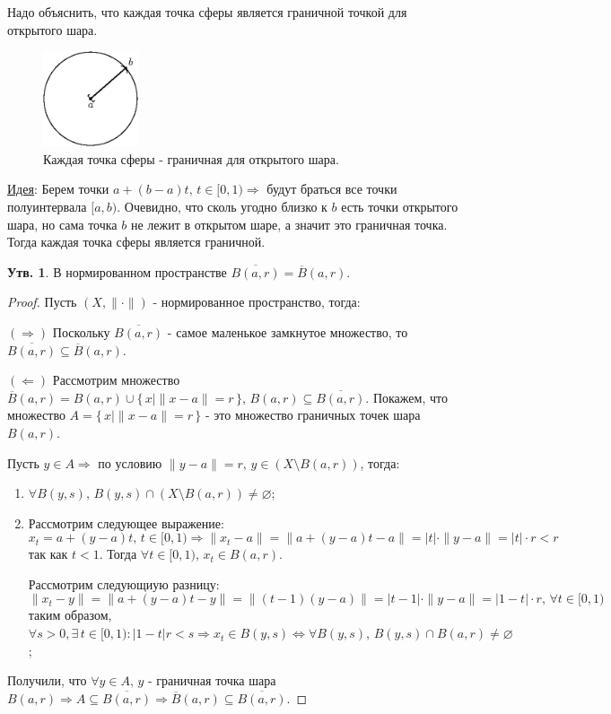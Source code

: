 \documentclass[12pt]{article}
\newcommand{\VN}{\varnothing}
\theoremstyle{definition}
\newtheorem{prop}{Утв.}
\begin{document}
Надо объяснить, что каждая точка сферы является граничной точкой для открытого шара.
\begin{figure}[H]
	\centering
	\includegraphics[width=0.25\textwidth]{8_1.eps}
	\caption{Каждая точка сферы - граничная для открытого шара.}
	\label{8_1}
\end{figure}
\uline{Идея}: Берем точки $a + (b-a)t, \, t \in [0,1) \Rightarrow$ будут браться все точки полуинтервала $[a,b)$. Очевидно, что сколь угодно близко к $b$ есть точки открытого шара, но сама точка $b$ не лежит в открытом шаре, а значит это граничная точка. Тогда каждая точка сферы является граничной.
\begin{prop}
	В нормированном пространстве $\overline{B(a,r)} = \overline{B}(a,r)$.
\end{prop}
\begin{proof} Пусть $(X,\|\cdot\|)$ - нормированное пространство, тогда:
	
	$(\Rightarrow)$ Поскольку $\overline{B(a,r)}$ - самое маленькое замкнутое множество, то $\overline{B(a,r)} \subseteq \overline{B}(a,r)$.
	
	$(\Leftarrow)$ Рассмотрим множество $\overline{B}(a,r) = B(a,r) \cup \{\,x \mid \|x - a\|= r \,\},\, B(a,r) \subseteq \overline{B(a,r)}$. Покажем, что множество $A = \{\,x \mid \|x - a\|= r \,\}$ - это множество граничных точек шара $B(a,r)$. 
	
	Пусть $y \in A \Rightarrow$ по условию $ \|y - a\| = r, \, y \in (X \setminus B(a,r))$, тогда:
	\begin{enumerate}[label ={(\arabic*)}]
		\item $\forall B(y,s), \, B(y,s) \cap (X \setminus B(a,r)) \neq \VN$;
		\item Рассмотрим следующее выражение: 
		$$
			x_t = a + (y-a)t,\, t \in [0,1) \Rightarrow \|x_t - a\| = \|a + (y-a)t - a\|= |t|{\cdot}\|y-a\| = |t|{\cdot}r < r
		$$
		так как $t < 1$. Тогда $\forall t \in [0,1), \, x_t \in B(a,r)$. 
		
		Рассмотрим следующиую разницу:
		$$
			\|x_t - y\| = \|a + (y-a)t - y\| = \|(t-1)(y-a)\| = |t-1|{\cdot}\|y-a\| = |1-t|{\cdot}r, \, \forall t \in [0,1)
		$$ 
		таким образом, $\forall s > 0, \exists \, t \in [0,1) \colon |1-t|r < s \Rightarrow x_t \in B(y,s) \Leftrightarrow \forall B(y,s),\, B(y,s) \cap B(a,r) \neq \VN$;
	\end{enumerate}
	Получили, что $\forall y \in A, \, y$ - граничная точка шара $B(a,r) \Rightarrow A \subseteq \overline{B(a,r)} \Rightarrow \overline{B}(a,r) \subseteq \overline{B(a,r)}$.
\end{proof}
\end{document}

